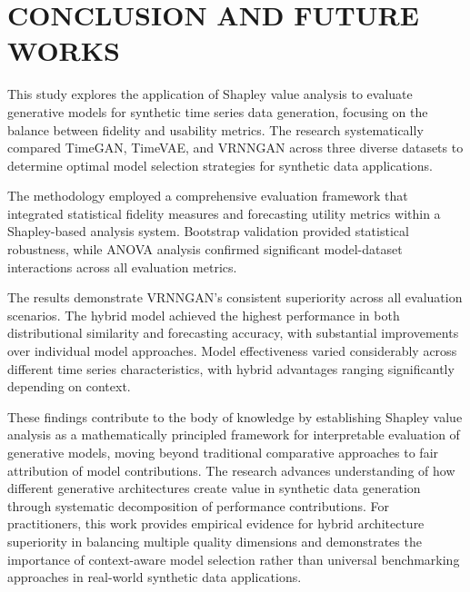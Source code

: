 \documentclass{article}
\begin{document}

\newpage
\section{CONCLUSION AND FUTURE WORKS}
This study explores the application of Shapley value analysis to evaluate generative models for synthetic time series data generation, focusing on the balance between fidelity and usability metrics. The research systematically compared TimeGAN, TimeVAE, and VRNNGAN across three diverse datasets to determine optimal model selection strategies for synthetic data applications. 

The methodology employed a comprehensive evaluation framework that integrated statistical fidelity measures and forecasting utility metrics within a Shapley-based analysis system. Bootstrap validation provided statistical robustness, while ANOVA analysis confirmed significant model-dataset interactions across all evaluation metrics.

The results demonstrate VRNNGAN's consistent superiority across all evaluation scenarios. The hybrid model achieved the highest performance in both distributional similarity and forecasting accuracy, with substantial improvements over individual model approaches. Model effectiveness varied considerably across different time series characteristics, with hybrid advantages ranging significantly depending on context. 

These findings contribute to the body of knowledge by establishing Shapley value analysis as a mathematically principled framework for interpretable evaluation of generative models, moving beyond traditional comparative approaches to fair attribution of model contributions. The research advances understanding of how different generative architectures create value in synthetic data generation through systematic decomposition of performance contributions. For practitioners, this work provides empirical evidence for hybrid architecture superiority in balancing multiple quality dimensions and demonstrates the importance of context-aware model selection rather than universal benchmarking approaches in real-world synthetic data applications.
\end{document}

